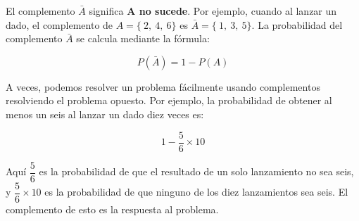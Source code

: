 El complemento $\bar{A}$ significa \textbf{A no sucede}. Por ejemplo, cuando
al lanzar un dado, el complemento de $A = \{~2,~4,~6\}$ es $\bar{A} = \{~1,~3,~5\}$. La probabilidad del complemento $\bar{A}$ se calcula mediante la fórmula:

$$P(\bar{A})=1-P(A)$$

A veces, podemos resolver un problema fácilmente usando complementos resolviendo el
problema opuesto. Por ejemplo, la probabilidad de obtener al menos un seis al lanzar un dado diez veces es:

$$1 - \dfrac{5}{6}\times 10 $$

Aquí $\dfrac{5}{6}$ es la probabilidad de que el resultado de un solo lanzamiento no sea seis, y $\dfrac{5}{6}\times 10$ es la probabilidad de que ninguno de los diez lanzamientos sea seis. El complemento de esto es la respuesta al problema.